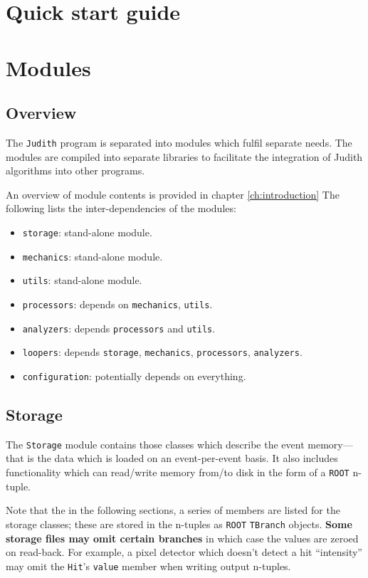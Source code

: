 \documentclass[10pt,a4paper]{book}
\newcommand{\ROOT}{\Verb`ROOT` }
\newcommand{\Judith}{\Verb`Judith` }
\begin{document}
\chapter{Quick start guide}

\chapter{Modules}
\label{ch:modules}

\section{Overview}

The \Judith program is separated into modules which fulfil separate needs. The modules are compiled into separate libraries to facilitate the integration of Judith algorithms into other programs.

An overview of module contents is provided in chapter \ref{ch:introduction} The following lists the inter-dependencies of the modules:

\begin{itemize}
    \item \Verb`storage`: stand-alone module.
    \item \Verb`mechanics`: stand-alone module.
    \item \Verb`utils`: stand-alone module.
    \item \Verb`processors`: depends on \Verb`mechanics`, \Verb`utils`.
    \item \Verb`analyzers`: depends \Verb`processors` and \Verb`utils`.
    \item \Verb`loopers`: depends \Verb`storage`, \Verb`mechanics`, \Verb`processors`, \Verb`analyzers`.
    \item \Verb`configuration`: potentially depends on everything.
\end{itemize}

\section{Storage}

The \Verb`Storage` module contains those classes which describe the event memory---that is the data which is loaded on an event-per-event basis. It also includes functionality which can read/write memory from/to disk in the form of a \ROOT n-tuple.

Note that the in the following sections, a series of members are listed for the storage classes; these are stored in the n-tuples as \ROOT \Verb`TBranch` objects. \textbf{Some storage files may omit certain branches} in which case the values are zeroed on read-back. For example, a pixel detector which doesn't detect a hit ``intensity'' may omit the \Verb`Hit`'s \Verb`value` member when writing output n-tuples.
\end{document}
